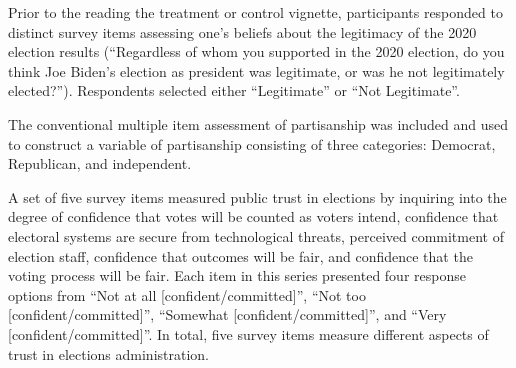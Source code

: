 \documentclass[
  12pt,
  letterpaper,
]{article}
\begin{document}
Prior to the reading the treatment or control vignette, participants
responded to distinct survey items assessing one's beliefs about the
legitimacy of the 2020 election results (``Regardless of whom you
supported in the 2020 election, do you think Joe Biden's election as
president was legitimate, or was he not legitimately elected?'').
Respondents selected either ``Legitimate'' or ``Not Legitimate''.

The conventional multiple item assessment of partisanship was included
and used to construct a variable of partisanship consisting of three
categories: Democrat, Republican, and independent.

A set of five survey items measured public trust in elections by
inquiring into the degree of confidence that votes will be counted as
voters intend, confidence that electoral systems are secure from
technological threats, perceived commitment of election staff,
confidence that outcomes will be fair, and confidence that the voting
process will be fair. Each item in this series presented four response
options from ``Not at all {[}confident/committed{]}'', ``Not too
{[}confident/committed{]}'', ``Somewhat {[}confident/committed{]}'', and
``Very {[}confident/committed{]}''. In total, five survey items measure
different aspects of trust in elections administration.
\end{document}

